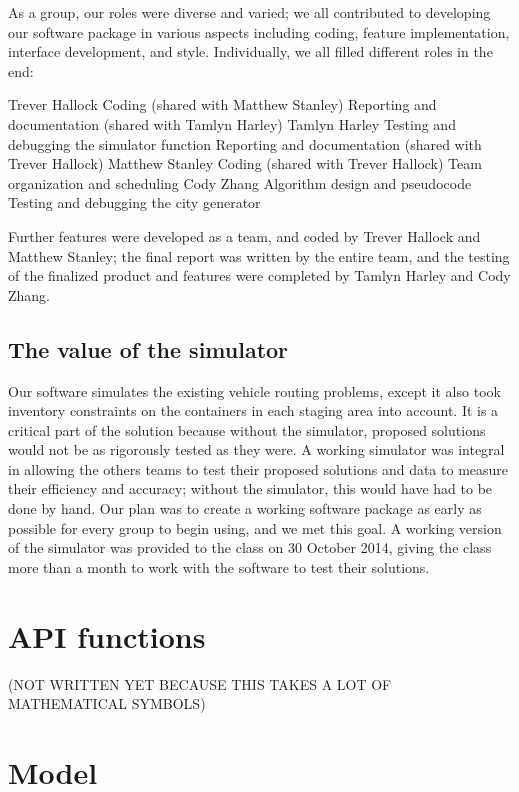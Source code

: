 \documentclass{article}
\begin{document}
As a group, our roles were diverse and varied; we all contributed to developing our software package in various aspects including coding, feature implementation, interface development, and style.  Individually, we all filled different roles in the end:

Trever Hallock
	Coding (shared with Matthew Stanley)
	Reporting and documentation (shared with Tamlyn Harley)
Tamlyn Harley
	Testing and debugging the simulator function
	Reporting and documentation (shared with Trever Hallock)
Matthew Stanley
	Coding (shared with Trever Hallock)
	Team organization and scheduling
Cody Zhang
	Algorithm design and pseudocode
	Testing and debugging the city generator

Further features were developed as a team, and coded by Trever Hallock and Matthew Stanley; the final report was written by the entire team, and the testing of the finalized product and features were completed by Tamlyn Harley and Cody Zhang.

\subsection{The value of the simulator}

Our software simulates the existing vehicle routing problems, except it also took inventory constraints on the containers in each staging area into account.  It is a critical part of the solution because without the simulator, proposed solutions would not be as rigorously tested as they were. A working simulator was integral in allowing the others teams to test their proposed solutions and data to measure their efficiency and accuracy; without the simulator, this would have had to be done by hand.  Our plan was to create a working software package as early as possible for every group to begin using, and we met this goal. A working version of the simulator was provided to the class on 30 October 2014, giving the class more than a month to work with the software to test their solutions.

\section{API functions}

(NOT WRITTEN YET BECAUSE THIS TAKES A LOT OF MATHEMATICAL SYMBOLS)

\section{Model}
\end{document}

